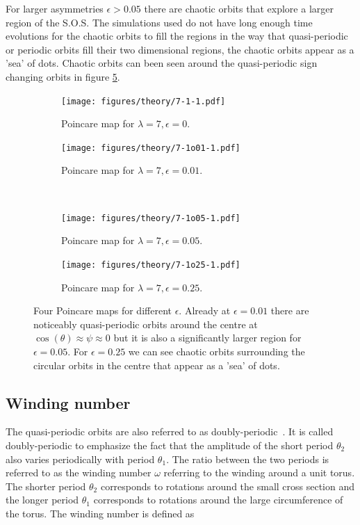 For larger asymmetries $\epsilon > 0.05$ there are chaotic orbits that explore a larger region of the S.O.S. The simulations used do not have long enough time evolutions for the chaotic orbits to fill the regions in the way that quasi-periodic or periodic orbits fill their two dimensional regions, the chaotic orbits appear as a 'sea' of dots. Chaotic orbits can been seen around the quasi-periodic sign changing orbits in figure \ref{fig:orbitmap4}.
%
%
%
\begin{figure}[H]
\centering
\begin{subfigure}[3a]{0.40\textwidth}
\texttt{[image: figures/theory/7-1-1.pdf]}
\caption{Poincare map for $\lambda = 7, \epsilon = 0$.}\label{fig:orbitmap1}
\end{subfigure}\hspace{1em}%
\begin{subfigure}[3b]{0.40\textwidth}
\texttt{[image: figures/theory/7-1o01-1.pdf]}
\caption{Poincare map for $\lambda = 7, \epsilon = 0.01$.}\label{fig:orbitmap2}
\end{subfigure} \\
\begin{subfigure}[3a]{0.40\textwidth}
\texttt{[image: figures/theory/7-1o05-1.pdf]}
\caption{Poincare map for $\lambda = 7, \epsilon = 0.05$.}\label{fig:orbitmap3}
\end{subfigure}\hspace{1em}%
	\begin{subfigure}[3b]{0.40\textwidth}
\texttt{[image: figures/theory/7-1o25-1.pdf]}
\caption{Poincare map for $\lambda = 7, \epsilon = 0.25$.}\label{fig:orbitmap4}
\end{subfigure} 
\caption{Four Poincare maps for different $\epsilon$. Already at $\epsilon = 0.01$ there are noticeably quasi-periodic 
orbits around the centre at $\cos(\theta) \approx \psi \approx 0$ but it is also a significantly larger region for $\epsilon = 0.05$. For $\epsilon = 0.25$ we can see chaotic orbits surrounding the circular orbits in the centre that appear as a 'sea' of dots.} %
\end{figure}

\subsection{Winding number} \label{sec:winding}
The quasi-periodic orbits are also referred to as doubly-periodic~\cite{Yarin}. It is called doubly-periodic to emphasize the fact that the amplitude of the short period $\theta_2$ also varies periodically with period $\theta_1$. The ratio between the two periods is referred to as the winding number $\omega$ referring to the winding around a unit torus. The shorter period $\theta_2$ corresponds to rotations around the small cross section and the longer period $\theta_1$ corresponds to rotations around the large circumference of the torus. The winding number is defined as \cite{introchaos}

